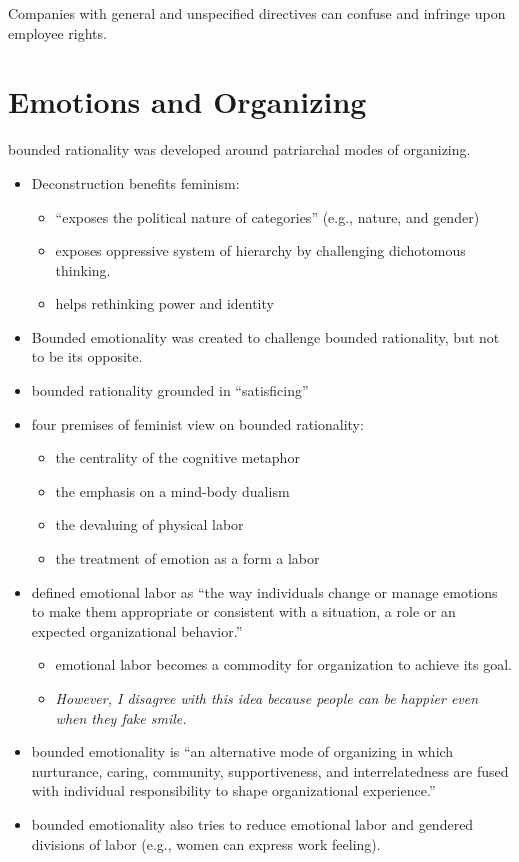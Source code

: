 \documentclass[
]{book}
\begin{document}
Companies with general and unspecified directives can confuse and infringe upon employee rights.

\hypertarget{emotions-and-organizing}{%
\chapter{Emotions and Organizing}\label{emotions-and-organizing}}

\citep{Mumby_1992}

bounded rationality was developed around patriarchal modes of organizing.

\begin{itemize}
\item
  Deconstruction benefits feminism:

  \begin{itemize}
  \item
    ``exposes the political nature of categories'' (e.g., nature, and gender)
  \item
    exposes oppressive system of hierarchy by challenging dichotomous thinking.
  \item
    helps rethinking power and identity
  \end{itemize}
\item
  Bounded emotionality was created to challenge bounded rationality, but not to be its opposite.
\item
  bounded rationality grounded in ``satisficing''
\item
  four premises of feminist view on bounded rationality:

  \begin{itemize}
  \item
    the centrality of the cognitive metaphor
  \item
    the emphasis on a mind-body dualism
  \item
    the devaluing of physical labor
  \item
    the treatment of emotion as a form a labor
  \end{itemize}
\item
  \citep{hochschild2012} defined emotional labor as ``the way individuals change or manage emotions to make them appropriate or consistent with a situation, a role or an expected organizational behavior.''

  \begin{itemize}
  \item
    emotional labor becomes a commodity for organization to achieve its goal.
  \item
    \emph{However, I disagree with this idea because people can be happier even when they fake smile.}
  \end{itemize}
\item
  bounded emotionality is ``an alternative mode of organizing in which nurturance, caring, community, supportiveness, and interrelatedness are fused with individual responsibility to shape organizational experience.''
\item
  bounded emotionality also tries to reduce emotional labor and gendered divisions of labor (e.g., women can express work feeling).
\end{itemize}
\end{document}
